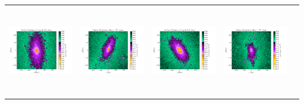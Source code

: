 \begin{tabular}{c c c c c}
 \hspace*{-1cm}\includegraphics[height=4cm,width=4cm,trim={2.5cm 1.5cm 5cm 1.5cm},clip]{../pngs/D22.png}  & 
 \hspace*{-.3cm}\includegraphics[height=4cm,width=4cm,trim={2.5cm 1.5cm 5cm 1.5cm},clip]{../pngs/D23.png}  & 
 \hspace*{-.3cm}\includegraphics[height=4cm,width=4cm,trim={2.5cm 1.5cm 5cm 1.5cm},clip]{../pngs/D24.png}  & 
 \hspace*{-.3cm}\includegraphics[height=4cm,width=4cm,trim={2.5cm 1.5cm 5cm 1.5cm},clip]{../pngs/D25.png}  &
 \\ 


\end{tabular}
